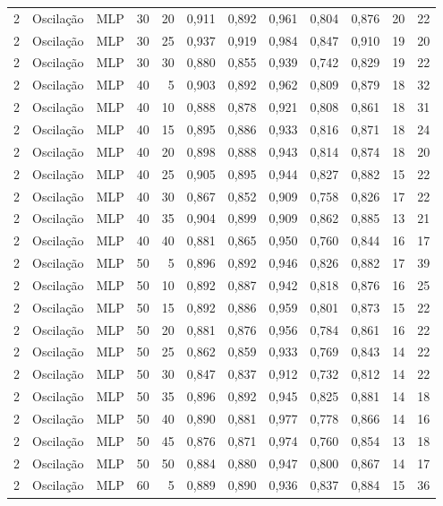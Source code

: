 \begin{longtable}{@{}rllrrrrrrrrr@{}}
2 & Oscilação & MLP & 30 & 20 & 0,911 & 0,892 & 0,961 & 0,804 & 0,876 & 20 & 22 \\
2 & Oscilação & MLP & 30 & 25 & 0,937 & 0,919 & 0,984 & 0,847 & 0,910 & 19 & 20 \\
2 & Oscilação & MLP & 30 & 30 & 0,880 & 0,855 & 0,939 & 0,742 & 0,829 & 19 & 22 \\
2 & Oscilação & MLP & 40 & 5 & 0,903 & 0,892 & 0,962 & 0,809 & 0,879 & 18 & 32 \\
2 & Oscilação & MLP & 40 & 10 & 0,888 & 0,878 & 0,921 & 0,808 & 0,861 & 18 & 31 \\
2 & Oscilação & MLP & 40 & 15 & 0,895 & 0,886 & 0,933 & 0,816 & 0,871 & 18 & 24 \\
2 & Oscilação & MLP & 40 & 20 & 0,898 & 0,888 & 0,943 & 0,814 & 0,874 & 18 & 20 \\
2 & Oscilação & MLP & 40 & 25 & 0,905 & 0,895 & 0,944 & 0,827 & 0,882 & 15 & 22 \\
2 & Oscilação & MLP & 40 & 30 & 0,867 & 0,852 & 0,909 & 0,758 & 0,826 & 17 & 22 \\
2 & Oscilação & MLP & 40 & 35 & 0,904 & 0,899 & 0,909 & 0,862 & 0,885 & 13 & 21 \\
2 & Oscilação & MLP & 40 & 40 & 0,881 & 0,865 & 0,950 & 0,760 & 0,844 & 16 & 17 \\
2 & Oscilação & MLP & 50 & 5 & 0,896 & 0,892 & 0,946 & 0,826 & 0,882 & 17 & 39 \\
2 & Oscilação & MLP & 50 & 10 & 0,892 & 0,887 & 0,942 & 0,818 & 0,876 & 16 & 25 \\
2 & Oscilação & MLP & 50 & 15 & 0,892 & 0,886 & 0,959 & 0,801 & 0,873 & 15 & 22 \\
2 & Oscilação & MLP & 50 & 20 & 0,881 & 0,876 & 0,956 & 0,784 & 0,861 & 16 & 22 \\
2 & Oscilação & MLP & 50 & 25 & 0,862 & 0,859 & 0,933 & 0,769 & 0,843 & 14 & 22 \\
2 & Oscilação & MLP & 50 & 30 & 0,847 & 0,837 & 0,912 & 0,732 & 0,812 & 14 & 22 \\
2 & Oscilação & MLP & 50 & 35 & 0,896 & 0,892 & 0,945 & 0,825 & 0,881 & 14 & 18 \\
2 & Oscilação & MLP & 50 & 40 & 0,890 & 0,881 & 0,977 & 0,778 & 0,866 & 14 & 16 \\
2 & Oscilação & MLP & 50 & 45 & 0,876 & 0,871 & 0,974 & 0,760 & 0,854 & 13 & 18 \\
2 & Oscilação & MLP & 50 & 50 & 0,884 & 0,880 & 0,947 & 0,800 & 0,867 & 14 & 17 \\
2 & Oscilação & MLP & 60 & 5 & 0,889 & 0,890 & 0,936 & 0,837 & 0,884 & 15 & 36 \\

\end{longtable}
